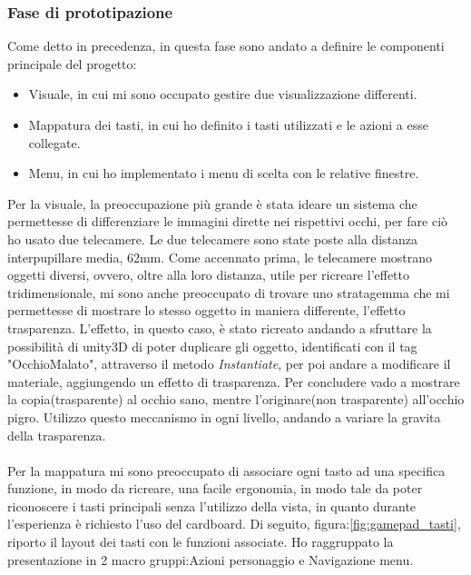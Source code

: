 \documentclass[
a4paper,
cleardoublepage=empty,
headings=twolinechapter,
numbers=autoenddot,
]{scrbook}
\begin{document}
    \subsubsection{Fase di prototipazione}
     Come detto in precedenza, in questa fase sono andato a definire le componenti principale del progetto:
     \begin{itemize}
     	\item Visuale, in cui mi sono occupato gestire due visualizzazione differenti.
     	\item Mappatura dei tasti, in cui ho definito i tasti utilizzati e le azioni a esse collegate.
     	\item Menu, in cui ho implementato i menu di scelta con le relative finestre.
     \end{itemize}
     Per la visuale, la preoccupazione più grande è stata ideare un sistema che permettesse di differenziare le immagini dirette nei rispettivi occhi, per fare ciò ho usato due telecamere.
     Le due telecamere sono state poste alla distanza interpupillare media, 62mm\cite{Distanza_occhi}.
     Come accennato prima, le telecamere mostrano oggetti diversi, ovvero, oltre alla loro distanza, utile per ricreare l'effetto tridimensionale, mi sono anche preoccupato di trovare uno stratagemma che mi permettesse di mostrare lo stesso oggetto in maniera differente, l'effetto trasparenza.
     L'effetto, in questo caso, è stato ricreato andando a sfruttare la possibilità di unity3D di poter duplicare gli oggetto, identificati con il tag "OcchioMalato", attraverso il metodo \textit{Instantiate}, per poi andare a modificare il materiale, aggiungendo un effetto di trasparenza.
     Per concludere vado a mostrare la copia(trasparente) al occhio sano, mentre l'originare(non trasparente) all'occhio pigro.
     Utilizzo questo meccanismo in ogni livello, andando a variare la gravita della trasparenza.\\\\
     Per la mappatura mi sono preoccupato di associare ogni tasto ad una specifica funzione, in modo da ricreare, una facile ergonomia, in modo tale da poter riconoscere i tasti principali senza l'utilizzo della vista, in quanto durante l'esperienza è richiesto l'uso del cardboard.
     Di seguito, figura:\ref{fig:gamepad_tasti}, riporto il layout dei tasti con le funzioni associate.
     Ho raggruppato la presentazione in 2 macro gruppi:Azioni personaggio e Navigazione menu.
\end{document}
